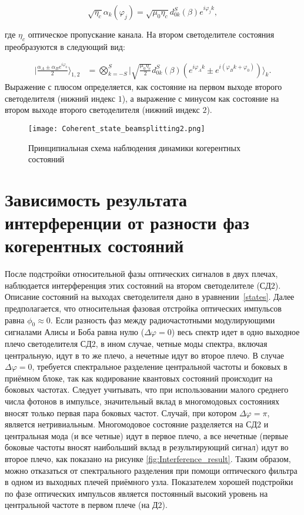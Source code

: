 \begin{equation}
\sqrt{\eta_c}\alpha_k(\varphi_j)=\sqrt{\mu_0\eta_c}d^S_{0k}(\beta)e^{i\varphi_jk},
\end{equation}


где $\eta_c$ оптическое пропускание канала. На втором светоделителе состояния преобразуются в следующий вид: 

\begin{align}\label{states}
\Big|\frac{\alpha_A \pm \alpha_Be^{i\varphi_0}}{2}\Big\rangle_{1,2} &= \bigotimes_{k=-S}^{S}\Big|\sqrt{\frac{\mu_0\eta_c}{2}}d_{0k}^{S}(\beta)\left(e^{i\varphi_Ak}\pm e^{i(\varphi_Bk+\varphi_0)}\right)\Big\rangle_k.
\end{align}
Выражение с плюсом определяется, как состояние на первом выходе второго светоделителя (нижний индекс $1$), а выражение с минусом как состояние на втором выходе второго светоделителя (нижний индекс  $2$). 
 
\begin{figure}[ht]
 \centering
  \texttt{[image: Coherent\_state\_beamsplitting2.png]}
  \caption{Принципиальная схема наблюдения динамики когерентных состояний}
  \label{fig:Coherent_states_beamsplitting2}
\end{figure}

\pagebreak

\section{Зависимость результата интерференции от разности фаз когерентных состояний} \label{ch:ch4/sec7}

После подстройки относительной фазы оптических сигналов в двух плечах, наблюдается интерференция этих состояний на втором светоделителе ($СД2$). Описание состояний на выходах светоделителя дано в уравнении~\ref{states}. Далее предполагается, что относительная фазовая отстройка оптических импульсов равна $\phi_0\approx0$. Если разность фаз между радиочастотными модулирующими сигналами Алисы и Боба равна нулю ($\Delta\varphi=0$) весь спектр идет в одно выходное плечо светоделителя $СД2$, в ином случае, четные моды спектра, включая центральную, идут в то же плечо, а нечетные идут во второе плечо. В случае $\Delta\varphi=0$, требуется спектральное разделение центральной частоты и боковых в приёмном блоке, так как кодирование квантовых состояний происходит на боковых частотах. Следует учитывать, что при использовании малого среднего числа фотонов в импульсе, значительный вклад в многомодовых состояниях вносят только первая пара боковых частот. Случай, при котором $\Delta\varphi=\pi$, является нетривиальным. Многомодовое состояние разделяется на $СД2$ и центральная мода (и все четные) идут в первое плечо, а все нечетные (первые боковые частоты вносят наибольший вклад в результирующий сигнал) идут во второе плечо, как показано на рисунке \ref{fig:Interference_result}. Таким образом, можно отказаться от спектрального разделения при помощи оптического фильтра в одном из выходных плечей приёмного узла. Показателем хорошей подстройки по фазе оптических импульсов является постоянный высокий уровень на центральной частоте в первом плече (на $Д2$).  


